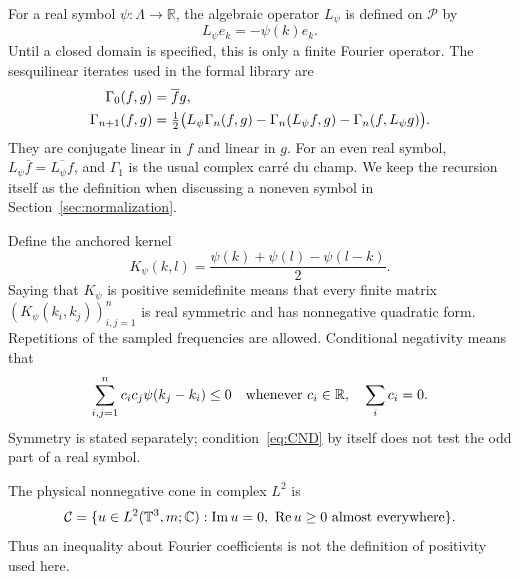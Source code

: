 \documentclass[11pt]{article}
\theoremstyle{remark}\newtheorem{remark}[theorem]{Remark}
\newcommand{\R}{\mathbb R}\newcommand{\C}{\mathbb C}
\begin{document}
For a real symbol $\psi:\Lambda\to\R$, the algebraic operator
$L_\psi$ is defined on $\mathcal P$ by
\begin{equation}\label{eq:L}
 L_\psi e_k=-\psi(k)e_k.
\end{equation}
Until a closed domain is specified, this is only a finite Fourier
operator. The sesquilinear iterates used in the formal library are
\begin{align}\label{eq:gamma}
 \Gamma_0(f,g)&=\overline f g,\notag\\
 \Gamma_{n+1}(f,g)&=\tfrac12\bigl(
 L_\psi\Gamma_n(f,g)-\Gamma_n(L_\psi f,g)
                         -\Gamma_n(f,L_\psi g)\bigr).
\end{align}
They are conjugate linear in $f$ and linear in $g$. For an even
real symbol, $L_\psi\overline f=\overline{L_\psi f}$, and
$\Gamma_1$ is the usual complex carré du champ. We keep the
recursion itself as the definition when discussing a noneven
symbol in Section~\ref{sec:normalization}.

Define the anchored kernel
\begin{equation}\label{eq:K}
 K_\psi(k,l)=\frac{\psi(k)+\psi(l)-\psi(l-k)}2.
\end{equation}
Saying that $K_\psi$ is positive semidefinite means that every
finite matrix $(K_\psi(k_i,k_j))_{i,j=1}^n$ is real symmetric and
has nonnegative quadratic form. Repetitions of the sampled
frequencies are allowed. Conditional negativity means that
\begin{equation}\label{eq:CND}
 \sum_{i,j=1}^n c_i c_j\psi(k_j-k_i)\leq0
 \quad\hbox{whenever }c_i\in\R,\quad\sum_i c_i=0.
\end{equation}
Symmetry is stated separately; condition~\eqref{eq:CND} by itself
does not test the odd part of a real symbol.

The physical nonnegative cone in complex $L^2$ is
\[
 \mathcal C=\{u\in L^2(\T^3,m;\C):
          \operatorname{Im}u=0,\ \operatorname{Re}u\geq0
          \text{ almost everywhere}\}.
\]
Thus an inequality about Fourier coefficients is not the
definition of positivity used here.
\end{document}
